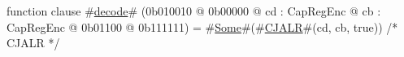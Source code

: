 function clause #\hyperref[zdecode]{decode}# (0b010010 @ 0b00000 @ cd : CapRegEnc @ cb : CapRegEnc @    0b01100 @ 0b111111) = #\hyperref[zSome]{Some}#(#\hyperref[zCJALR]{CJALR}#(cd, cb, true)) /* CJALR */
